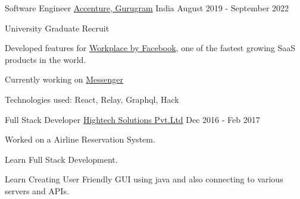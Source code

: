\begin{cventries}

  \cventry
  {Software Engineer}
  {\href{https://www.facebook.com}{Accenture, Gurugram}}
  {India}
  {August 2019 - September 2022}
  {
    \begin{cvitems}
    \item University Graduate Recruit
    \item Developed features for \href{https://www.workplace.com}{Workplace by
        Facebook}, one of the fastest growing SaaS products in the world.
    \item Currently working on \href{https://www.messenger.com}{Messenger}
      \ifdefined \ONEPAGE \else
    \item Technologies used: React, Relay, Graphql, Hack
      \fi
    \end{cvitems}
  }
  \cventry
  {Full Stack Developer}
  {\href{http://www.localites.com}{Hightech Solutions Pvt.Ltd}}
  {Dec 2016 - Feb 2017}
  {
    \begin{cvitems}
    \item Worked on a Airline Reservation System.
    \item Learn Full Stack Development.
    \item Learn Creating User Friendly GUI using java and also connecting to various servers and APIs.
        \ifdefined \ONEPAGE \
    \end{cvitems}
  }

\end{cventries}
\vspace{-2mm}

